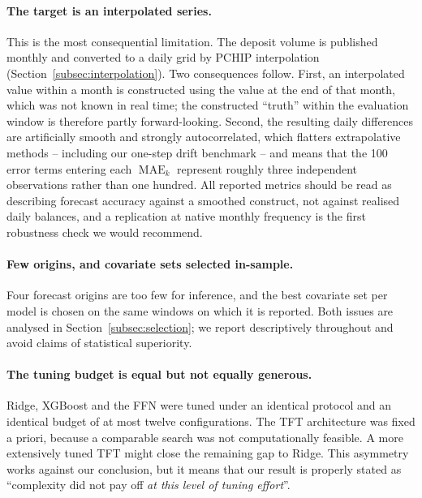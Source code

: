 \documentclass[11pt,a4paper]{article}
\begin{document}
\paragraph{The target is an interpolated series.}
This is the most consequential limitation. The deposit volume is published
monthly and converted to a daily grid by PCHIP interpolation
(Section~\ref{subsec:interpolation}). Two consequences follow. First, an
interpolated value within a month is constructed using the value at the end of
that month, which was not known in real time; the constructed ``truth'' within
the evaluation window is therefore partly forward-looking. Second, the
resulting daily differences are artificially smooth and strongly
autocorrelated, which flatters extrapolative methods -- including our one-step
drift benchmark -- and means that the 100 error terms entering each
$\operatorname{MAE}_k$ represent roughly three independent observations rather
than one hundred. All reported metrics should be read as describing forecast
accuracy against a smoothed construct, not against realised daily balances,
and a replication at native monthly frequency is the first robustness check we
would recommend.

\paragraph{Few origins, and covariate sets selected in-sample.}
Four forecast origins are too few for inference, and the best covariate set
per model is chosen on the same windows on which it is reported. Both issues
are analysed in Section~\ref{subsec:selection}; we report descriptively
throughout and avoid claims of statistical superiority.

\paragraph{The tuning budget is equal but not equally generous.}
Ridge, XGBoost and the FFN were tuned under an identical protocol and an
identical budget of at most twelve configurations. The TFT architecture was
fixed a priori, because a comparable search was not computationally feasible.
A more extensively tuned TFT might close the remaining gap to Ridge. This
asymmetry works against our conclusion, but it means that our result is
properly stated as ``complexity did not pay off \emph{at this level of tuning
effort}''.
\end{document}
